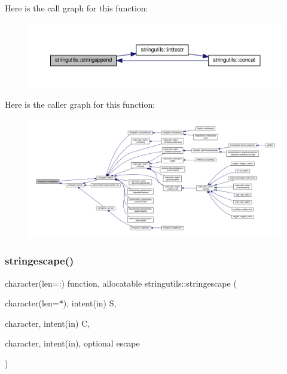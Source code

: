 Here is the call graph for this function\+:
\nopagebreak
\begin{figure}[H]
\begin{center}
\leavevmode
\includegraphics[width=350pt]{namespacestringutils_a921ef80710acba9d901b45479ddae08d_cgraph}
\end{center}
\end{figure}
Here is the caller graph for this function\+:
\nopagebreak
\begin{figure}[H]
\begin{center}
\leavevmode
\includegraphics[width=350pt]{namespacestringutils_a921ef80710acba9d901b45479ddae08d_icgraph}
\end{center}
\end{figure}
\mbox{\label{namespacestringutils_a077361529d56f5b3f1903f5a145a4745}} 
\subsubsection{\texorpdfstring{stringescape()}{stringescape()}}
{\footnotesize\ttfamily character(len=\+:) function, allocatable stringutils\+::stringescape (\begin{DoxyParamCaption}\item[{character(len=$\ast$), intent(in)}]{S,  }\item[{character, intent(in)}]{C,  }\item[{character, intent(in), optional}]{escape }\end{DoxyParamCaption})}

